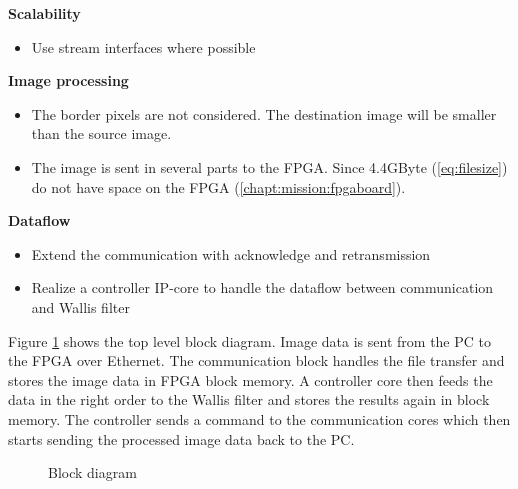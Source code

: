 \textbf{Scalability}
    \begin{itemize}
        \item Use stream interfaces where possible
    \end{itemize}

\textbf{Image processing}
    \begin{itemize}
        \item The border pixels are not considered. The destination image will be smaller than the source image. 
        \item The image is sent in several parts to the FPGA. Since 4.4GByte (\ref{eq:filesize}) do not have space on the FPGA (\ref{chapt:mission:fpgaboard}).
    \end{itemize}

\textbf{Dataflow}
    \begin{itemize}
        \item Extend the communication with acknowledge and retransmission
        \item Realize a controller IP-core to handle the dataflow between
        communication and Wallis filter
    \end{itemize}

Figure \ref{fig:blockdiagram} shows the top level block diagram. Image data is
sent from the PC to the FPGA over Ethernet. The communication block handles the
file transfer and stores the image data in FPGA block memory. A controller core
then feeds the data in the right order to the Wallis filter and stores the
results again in block memory. The controller sends a command to the
communication cores which then starts sending the processed image data back to
the PC.

\begin{figure}[b!]
    \centering
    \caption{Block diagram}
    \label{fig:blockdiagram}
\end{figure}

